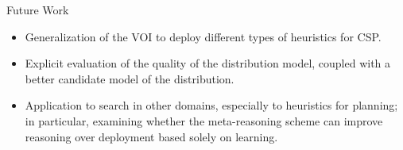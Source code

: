 \documentclass{beamer}
\begin{document}
\begin{frame}{Future Work}
\begin{itemize}
\item Generalization of the VOI to deploy different types of
  heuristics for CSP.
\item Explicit evaluation of the quality of the distribution model, coupled
  with a better candidate model of the distribution.
\item Application to search in other domains, especially
  to heuristics for planning;  in particular, examining whether
  the meta-reasoning scheme can improve reasoning over deployment based
  solely on learning.
\end{itemize}
\end{frame}
\end{document}
